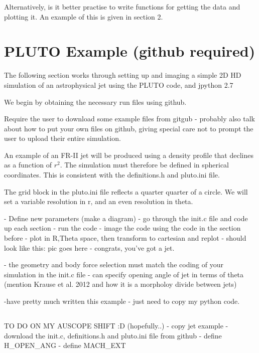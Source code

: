 \documentclass[12pt]{article}
\begin{document}
Alternatively, is it better practise to write functions for getting the data and plotting it. An example of this is given in section 2.

\section{PLUTO Example (github required)}

The following section works through setting up and imaging a simple 2D HD simulation of an astrophysical jet using the PLUTO code, and jpython 2.7

We begin by obtaining the necessary run files using github.



Require the user to download some example files from gitgub
- probably also talk about how to put your own files on github, giving special care not to prompt the user to upload their entire simulation.



An example of an FR-II jet will be produced using a density profile that declines as a function of $r^{2}$. The simulation must therefore be defined in spherical coordinates. This is consistent with the definitions.h and pluto.ini file.

The grid block in the pluto.ini file reflects a quarter quarter of a circle. We will set a variable resolution in r, and an even resolution in theta.

- Define new parameters (make a diagram)
- go through the init.c file and code up each section
- run the code
- image the code using the code in the section before
- plot in R,Theta space, then transform to cartesian and replot
- should look like this: pic goes here
- congrats, you've got a jet.


- the geometry and body force selection must match the coding of your simulation in the init.c file
- can specify opening angle of jet in terms of theta (mention Krause et al. 2012 and how it is a morpholoy divide between jets)

-have pretty much written this example - just need to copy my python code.

\subsection{}
TO DO ON MY AUSCOPE SHIFT :D (hopefully..)
- copy jet example
- download the init.c, definitions.h and pluto.ini file from github
- define  H\_OPEN\_ANG
- define  MACH\_EXT
\end{document}
